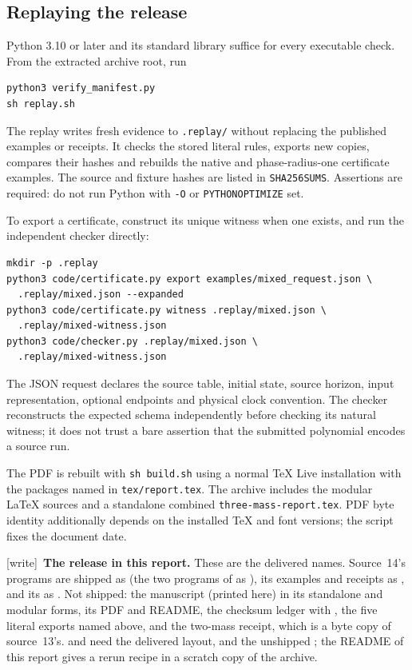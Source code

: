 \documentclass[11pt,letterpaper]{article}
\numberwithin{equation}{section}
\theoremstyle{definition}
\theoremstyle{remark}
\newcommand{\wtag}{\textup{[write]}}
\begin{document}
\subsection{Replaying the release}

Python 3.10 or later and its standard library suffice for every executable
check. From the extracted archive root, run
\begin{lstlisting}
python3 verify_manifest.py
sh replay.sh
\end{lstlisting}
The replay writes fresh evidence to \texttt{.replay/} without replacing the
published examples or receipts. It checks the stored literal rules, exports
new copies, compares their hashes and rebuilds the native and phase-radius-one
certificate examples. The source and fixture hashes are listed in
\texttt{SHA256SUMS}. Assertions are required: do not run Python with
\texttt{-O} or \texttt{PYTHONOPTIMIZE} set.

To export a certificate, construct its unique witness when one exists, and
run the independent checker directly:
\begin{lstlisting}
mkdir -p .replay
python3 code/certificate.py export examples/mixed_request.json \
  .replay/mixed.json --expanded
python3 code/certificate.py witness .replay/mixed.json \
  .replay/mixed-witness.json
python3 code/checker.py .replay/mixed.json \
  .replay/mixed-witness.json
\end{lstlisting}
The JSON request declares the source table, initial state, source horizon,
input representation, optional endpoints and physical clock convention.
The checker reconstructs the expected schema independently before
checking its natural witness; it does not trust a bare assertion that the
submitted polynomial encodes a source run.

The PDF is rebuilt with \texttt{sh build.sh} using a normal TeX Live
installation with the packages named in \texttt{tex/report.tex}. The
archive includes the modular LaTeX sources and a standalone combined
\texttt{three-mass-report.tex}. PDF byte identity additionally depends on
the installed TeX and font versions; the script fixes the document date.

\wtag\ \textbf{The release in this report.} These are the delivered names. Source~14's programs are shipped as  (the two programs of  as ), its examples and receipts as , and its  as . Not shipped: the manuscript (printed here) in its standalone and modular forms, its PDF and README, the checksum ledger  with , the five literal exports named above, and the two-mass receipt, which is a byte copy of source~13's.  and  need the delivered layout, and  the unshipped ; the README of this report gives a rerun recipe in a scratch copy of the archive.
\end{document}
